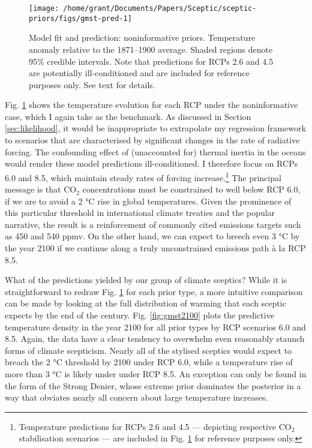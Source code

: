 \documentclass[smallextended]{svjour3}       %
\begin{document}
\begin{figure}

{\centering \texttt{[image: /home/grant/Documents/Papers/Sceptic/sceptic-priors/figs/gmst-pred-1]} 

}

\caption{Model fit and prediction: noninformative priors. Temperature anomaly relative to the 1871--1900 average. Shaded regions denote 95\% credible intervals. Note that predictions for RCPs 2.6 and 4.5 are potentially ill-conditioned and are included for reference purposes only. See text for details.}\label{fig:gmst-pred}
\end{figure}

Fig. \ref{fig:gmst-pred} shows the temperature evolution for each RCP
under the noninformative case, which I again take as the benchmark. As
discussed in Section \ref{sec:likelihood}, it would be inappropriate to
extrapolate my regression framework to scenarios that are characterised
by significant changes in the rate of radiative forcing. The confounding
effect of (unaccounted for) thermal inertia in the oceans would render
these model predictions ill-conditioned. I therefore focus on RCPs 6.0
and 8.5, which maintain steady rates of forcing increase.\footnote{Temperature
  predictions for RCPs 2.6 and 4.5 --- depicting respective CO\(_2\)
  stabilisation scenarios --- are included in Fig. \ref{fig:gmst-pred}
  for reference purposes only.} The principal message is that CO\(_2\)
concentrations must be constrained to well below RCP 6.0, if we are to
avoid a 2 °C rise in global temperatures. Given the prominence of this
particular threshold in international climate treaties and the popular
narrative, the result is a reinforcement of commonly cited emissions
targets such as 450 and 540 ppmv. On the other hand, we can expect to
breech even 3 °C by the year 2100 if we continue along a truly
unconstrained emissions path à la RCP 8.5.

What of the predictions yielded by our group of climate sceptics? While
it is straightforward to redraw Fig. \ref{fig:gmst-pred} for each prior
type, a more intuitive comparison can be made by looking at the full
distribution of warming that each sceptic expects by the end of the
century. Fig. \ref{fig:gmst2100} plots the predictive temperature
density in the year 2100 for all prior types by RCP scenarios 6.0 and
8.5. Again, the data have a clear tendency to overwhelm even reasonably
staunch forms of climate scepticism. Nearly all of the stylised sceptics
would expect to breach the 2 °C threshold by 2100 under RCP 6.0, while a
temperature rise of more than 3 °C is likely under under RCP 8.5. An
exception can only be found in the form of the Strong Denier, whose
extreme prior dominates the posterior in a way that obviates nearly all
concern about large temperature increases.
\end{document}
